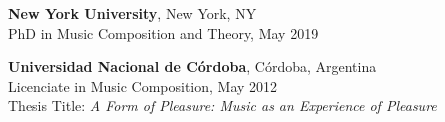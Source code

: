 \textbf{New York University}, New York, NY \\
PhD in Music Composition and Theory, May 2019\hfill

\textbf{Universidad Nacional de Córdoba}, Córdoba, Argentina\\
Licenciate in Music Composition, May 2012\hfill\\
Thesis Title: {\sl A Form of Pleasure: Music as an Experience of Pleasure}